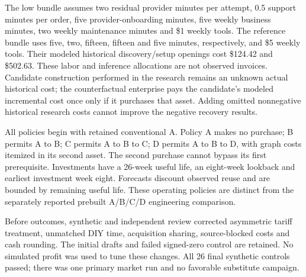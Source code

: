 The low bundle assumes two residual provider minutes per attempt, 0.5 support minutes per order,
five provider-onboarding minutes, five weekly business minutes, two weekly maintenance minutes
and \$1 weekly tools. The reference bundle uses five, two, fifteen, fifteen and five minutes,
respectively, and \$5 weekly tools. Their modeled historical discovery/setup openings cost
\$124.42 and \$502.63. These labor and inference allocations are not observed invoices.
Candidate construction performed in the research remains an unknown actual historical cost;
the counterfactual enterprise pays the candidate's modeled incremental cost once only if
it purchases that asset. Adding omitted nonnegative historical research costs cannot improve
the negative recovery results.

All policies begin with retained conventional A. Policy A makes no purchase; B permits A to B;
C permits A to B to C; D permits A to B to D, with graph costs itemized in its second asset.
The second purchase cannot bypass its first prerequisite. Investments have a 26-week useful
life, an eight-week lookback and earliest investment week eight. Forecasts discount observed
reuse and are bounded by remaining useful life. These operating policies are distinct from
the separately reported prebuilt A/B/C/D engineering comparison.

Before outcomes, synthetic and independent review corrected asymmetric tariff treatment,
unmatched DIY time, acquisition sharing, source-blocked costs and cash rounding. The initial
drafts and failed signed-zero control are retained. No simulated profit was used to tune these
changes. All 26 final synthetic controls passed; there was one primary market run and no
favorable substitute campaign.
